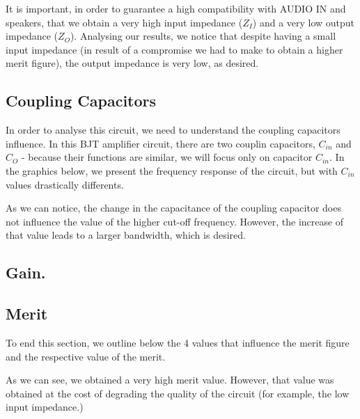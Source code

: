 It is important, in order to guarantee a high compatibility with AUDIO IN and speakers, that we obtain a very high input impedance ($Z_I$) and a very low output impedance ($Z_O$). Analysing our results, we notice that despite having a small input impedance (in result of a compromise we had to make to obtain a higher merit figure), the output impedance is very low, as desired.


\subsection{Coupling Capacitors}
In order to analyse this circuit, we need to understand the coupling capacitors influence. In this BJT amplifier circuit, there are two couplin capacitors, $C_{in}$ and $C_O$ - because their functions are similar, we will focus only on capacitor $C_{in}$. In the graphics below, we present the frequency response of the circuit, but with $C_{in}$ values drastically differents.

As we can notice, the change in the capacitance of the coupling capacitor does not influence the value of the higher cut-off frequency. However, the increase of that value leads to a larger bandwidth, which is desired.
\subsection{Gain.}



\subsection{Merit}
To end this section, we outline below the 4 values that influence the merit figure and the respective value of the merit.

%    

As we can see, we obtained a very high merit value. However, that value was obtained at the cost of degrading the quality of the circuit (for example, the low input impedance.)



